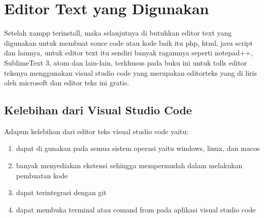 \section{ Editor Text yang Digunakan}
	Setelah xampp terinstall, maka selanjutnya di butuhkan editor text yang digunakan untuk membuat souce code atau kode baik itu php, html, java script dan lainnya, untuk editor text itu sendiri banyak ragamnya seperti notepad++, SublimeText 3, atom dan lain-lain, terkhusus pada buku ini untuk tolls editor teksnya menggunakan visual studio code yang merupakan editorteks yang di liris oleh  microsoft dan editor teks ini gratis.

\subsection{Kelebihan dari Visual Studio Code}
Adapun kelebihan dari editor teks visual studio code yaitu:
\begin{enumerate}
\item dapat di gunakan pada semua sistem operasi yaitu windows, linux, dan macos
\item banyak menyediakan ekstensi sehingga mempermudah dalam melakukan pembuatan kode
\item dapat terintegrasi dengan git 
\item dapat membuka terminal atau comand from pada aplikasi visual studio code
\end{enumerate}

